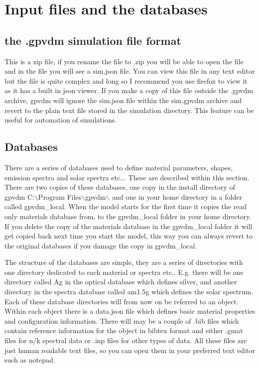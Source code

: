\newpage
\section{Input files and the databases}

\subsection{the .gpvdm simulation file format}
This is a zip file, if you rename the file to .zip you will be able to open the file and in the file you will see a sim.json file.  You can view this file in any text editor but the file is quite complex and long so I recommend you use firefox to view it as it has a built in json viewer.  If you make a copy of this file outside the .gpvdm archive, gpvdm will ignore the sim.json file within the sim.gpvdm archive and revert to the plain text file stored in the simulation directory.  This feature can be useful for automation of simulations.

\subsection{Databases}
There are a series of databases used to define material parameters, shapes, emission spectra and solar spectra etc...  These are described within this section.  There are two copies of these databases, one copy in the install directory of gpvdm  C:$\backslash$Program Files$\backslash$gpvdm$\backslash$ and one in your home directory in a folder called gpvdm\_local.   When the model starts for the first time it copies the read only materials database from, to the gpvdm\_local folder in your home directory.  If you delete the copy of the materials database in the gpvdm\_local folder it will get copied back next time you start the model, this way you can always revert to the original databases if you damage the copy in gpvdm\_local.

The structure of the databases are simple, they are a series of directories with one directory dedicated to each material or spectra etc.. E.g. there will be one directory called Ag in the optical database which defines silver, and another directory in the spectra database called am1.5g which defines the solar spectrum.  Each of these database directories will from now on be referred to an object.  Within each object there is a data.json file which defines basic material properties and configuration information.  There will may be a couple of .bib files which contain reference information for the object in bibtex format and either .gmat files for n/k spectral data or .inp files for other types of data.  All these files are just human readable text files, so you can open them in your preferred text editor such as notepad.


